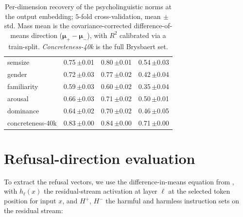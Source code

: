 \documentclass[11pt]{article}
\begin{document}
\begin{table}[t]
{\begin{tabular}{@{}lccc@{}}
semsize          & 0.75\,\scriptsize$\pm$0.01 & 0.80\,\scriptsize$\pm$0.01 & 0.54\,\scriptsize$\pm$0.03 \\
gender           & 0.72\,\scriptsize$\pm$0.03 & 0.77\,\scriptsize$\pm$0.02 & 0.42\,\scriptsize$\pm$0.04 \\
familiarity      & 0.59\,\scriptsize$\pm$0.03 & 0.60\,\scriptsize$\pm$0.02 & 0.35\,\scriptsize$\pm$0.04 \\
arousal          & 0.66\,\scriptsize$\pm$0.03 & 0.71\,\scriptsize$\pm$0.02 & 0.50\,\scriptsize$\pm$0.01 \\
dominance        & 0.64\,\scriptsize$\pm$0.02 & 0.70\,\scriptsize$\pm$0.02 & 0.46\,\scriptsize$\pm$0.05 \\
concreteness-40k & 0.83\,\scriptsize$\pm$0.00 & 0.84\,\scriptsize$\pm$0.00 & 0.71\,\scriptsize$\pm$0.00 \\
\bottomrule
\end{tabular}}
\caption{Per-dimension recovery of the psycholinguistic norms at the output
embedding; $5$-fold cross-validation, mean$\,\pm\,$std. Mass mean is the covariance-corrected difference-of-means direction
($\bm{\mu}_{+}-\bm{\mu}_{-}$), with $R^2$ calibrated via a train-split. \textit{Concreteness-40k} is the full Brysbaert set.}
\label{tab:probes}
\end{table}


\section{Refusal-direction evaluation}
\label{app:refusal}



To extract the refusal vectors, we use the difference-in-means equation from \cite{arditi2024refusallanguagemodelsmediated}, with $h_\ell(x)$ the residual-stream activation at layer $\ell$ at the selected token position for input $x$, and $H^{+}$, $H^{-}$ the harmful and harmless instruction sets on the residual stream:
\end{document}
